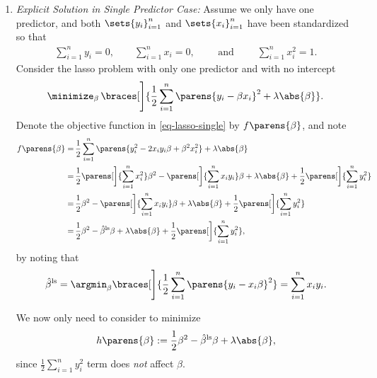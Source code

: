\documentclass[12pt]{article}
\begin{document}
\begin{enumerate}[label=\textbf{\arabic*.}]
\begin{enumerate}
		\item \textit{Explicit Solution in Single Predictor Case:} Assume we only have one predictor, and both $\sets{y_i}_{i=1}^n$ and $\sets{x_i}_{i=1}^n$ have been standardized so that 
		\begin{align*}
			\sum_{i=1}^n y_i = 0, \qquad \sum_{i=1}^n x_i = 0, \qquad \text{ and } \qquad \sum_{i=1}^n x_i^2 = 1. 
		\end{align*}
		Consider the lasso problem with only one predictor and with no intercept 
		\begin{align}\label{eq-lasso-single}
			\minimize_{\beta} \, \braces[\Bigg]{ \frac{1}{2} \sum_{i=1}^n \parens{y_i - \beta x_i}^2 + \lambda \abs{\beta}}. 
		\end{align}
		Denote the objective function in \eqref{eq-lasso-single} by $f \parens{\beta}$, and note 
		\begin{align*}
			f \parens{\beta} = & \, \frac{1}{2} \sum_{i=1}^n \parens{y_i^2 - 2 x_i y_i \beta + \beta^2 x_i^2} + \lambda \abs{\beta} \\ 
			= & \, \frac{1}{2} \parens[\bigg]{\sum_{i=1}^n x_i^2} \beta^2 - \parens[\bigg]{\sum_{i=1}^n x_i y_i} \beta + \lambda \abs{\beta} + \frac{1}{2} \parens[\bigg]{\sum_{i=1}^n y_i^2} \\ 
			= & \, \frac{1}{2} \beta^2 - \parens[\bigg]{\sum_{i=1}^n x_i y_i} \beta + \lambda \abs{\beta} + \frac{1}{2} \parens[\bigg]{\sum_{i=1}^n y_i^2} \\ 
			= & \, \frac{1}{2} \beta^2 - \hat{\beta}^{\mathrm{ls}} \beta + \lambda \abs{\beta} + \frac{1}{2} \parens[\bigg]{\sum_{i=1}^n y_i^2}, 
		\end{align*}
		by noting that 
		\begin{align*}
			\hat{\beta}^{\mathrm{ls}} = \argmin_{\beta} \braces[\Bigg]{\frac{1}{2} \sum_{i=1}^n \parens{y_i - x_i \beta}^2} = \sum_{i=1}^n x_i y_i. 
		\end{align*}
		
		We now only need to consider to minimize 
		\begin{align*}
			h \parens{\beta} := \frac{1}{2} \beta^2 - \hat{\beta}^{\mathrm{ls}} \beta + \lambda \abs{\beta}, 
		\end{align*}
		since $\frac{1}{2} \sum_{i=1}^n y_i^2$ term does \emph{not} affect $\beta$. 
		

\end{enumerate}
\end{enumerate}
\end{document}
